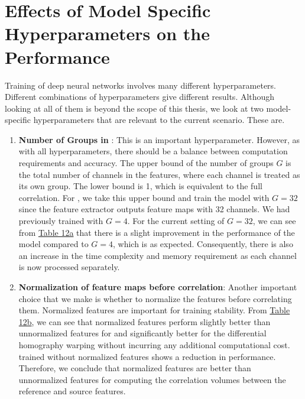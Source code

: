 \section{Effects of Model Specific Hyperparameters on the Performance}\label{sec:exp-hyper}
Training of deep neural networks involves many different hyperparameters. Different combinations of hyperparameters give different results. Although looking at all of them is beyond the scope of this thesis, we look at two model-specific hyperparameters that are relevant to the current scenario. These are.

\begin{enumerate}
    \item \textbf{Number of Groups in {\gwc}}: This is an important hyperparameter. However, as with all hyperparameters, there should be a balance between computation requirements and accuracy. The upper bound of the number of groups \(G\) is the total number of channels in the features, where each channel is treated as its own group. The lower bound is 1, which is equivalent to the full correlation. For {\mvsn}, we take this upper bound and train the model with \(G=32\) since the {\mvsn} feature extractor outputs feature maps with 32 channels. We had previously trained {\mvsn} with \(G=4\). For the current setting of \(G=32\), we can see from \hyperref[tab:hyp]{Table 12a} that there is a slight improvement in the performance of the model compared to \(G=4\), which is as expected. Consequently, there is also an increase in the time complexity and memory requirement as each channel is now processed separately. 
    \item \textbf{Normalization of feature maps before correlation}: Another important choice that we make is whether to normalize the features before correlating them. Normalized features are important for training stability. From \hyperref[tab:hyp]{Table 12b}, we can see that normalized features perform slightly better than unnormalized features for {\gwc} and significantly better for the differential homography warping without incurring any additional computational cost. {\rmvd} trained without normalized features shows a reduction in performance. Therefore, we conclude that normalized features are better than unnormalized features for computing the correlation volumes between the reference and source features. 
\end{enumerate}
